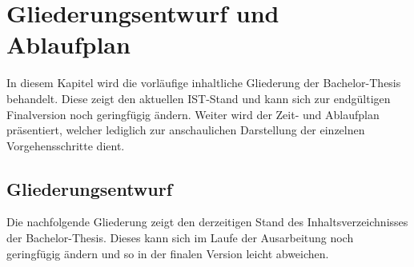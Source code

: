 
\chapter{Gliederungsentwurf und Ablaufplan}
\label{ch:FreieSoftware}

In diesem Kapitel wird die vorläufige inhaltliche Gliederung der Bachelor-Thesis behandelt. 
Diese zeigt den aktuellen IST-Stand und kann sich zur endgültigen Finalversion noch geringfügig ändern.
Weiter wird der Zeit- und Ablaufplan präsentiert, welcher lediglich zur anschaulichen Darstellung der einzelnen Vorgehensschritte dient.
  
\section{Gliederungsentwurf}
\label{ch:FreieSoftware:sec:Gliederung}

Die nachfolgende Gliederung zeigt den derzeitigen Stand des Inhaltsverzeichnisses der Bachelor-Thesis. Dieses kann sich im Laufe der Ausarbeitung noch geringfügig ändern und so in der finalen Version leicht abweichen.

